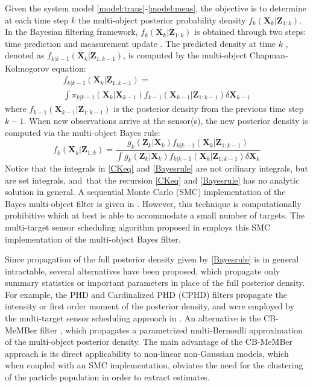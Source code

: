 \documentclass[twocolumn]{autart}
\begin{document}
Given the system model \eqref{model:trans}-\eqref{model:meas}, the objective
is to determine at each time step $k$ the multi-object posterior probability
density $f_{k}(\mathbf{X}_{k}|\mathbf{Z}_{1:k})$. In the Bayesian filtering
framework, $f_{k}(\mathbf{X}_{k}|\mathbf{Z}_{1:k})$ is obtained through two
steps: time prediction and measurement update \cite{Mah07}. The predicted
density at time $k$ , denoted as $f_{k|k-1}(\mathbf{X}_{k}|\mathbf{Z}_{1:k-1})$, is computed by the multi-object Chapman-Kolmogorov equation:
\begin{multline}\label{CKeq}
f_{k|k-1}(\mathbf{X}_k|\mathbf{Z}_{1:k-1}) =\\
 \int \pi_{k|k-1}(\mathbf{X}_k|\mathbf{X}_{k-1})f_{k-1}(\mathbf{X}_{k-1}|\mathbf{Z}_{1:k-1})\delta \mathbf{X}_{k-1}
\end{multline}
where $f_{k-1}(\mathbf{X}_{k-1}|\mathbf{Z}_{1:k-1})$ is the posterior
density from the previous time step $k-1$. When new observations arrive at
the sensor(s), the new posterior density is computed via the multi-object
Bayes rule:
\begin{equation}
f_{k}(\mathbf{X}_{k}|\mathbf{Z}_{1:k})=\frac{g_{k}(\mathbf{Z}_{k}|\mathbf{X}_{k})f_{k|k-1}(\mathbf{X}_{k}|\mathbf{Z}_{1:k-1})}{\int g_{k}(\mathbf{Z}_{k}|\mathbf{X}_{k})f_{k|k-1}(\mathbf{X}_{k}|\mathbf{Z}_{1:k-1})\delta \mathbf{X}_{k}}  \label{Bayesrule}
\end{equation}Notice that the integrals in \eqref{CKeq} and \eqref{Bayesrule} are not
ordinary integrals, but are set integrals, and\ that the recursion \eqref{CKeq} and \eqref{Bayesrule} has no analytic solution in general. A
sequential Monte Carlo (SMC) implementation of the Bayes multi-object filter
is given in \cite{VoAES}. However, this technique is computationally
prohibitive which at best is able to accommodate a small number of targets.
The multi-target sensor scheduling algorithm proposed in \cite{RV10} employs
this SMC implementation of the multi-object Bayes filter.

Since propagation of the full posterior density given by \eqref{Bayesrule}
is in general intractable, several alternatives have been proposed, which
propagate only summary statistics or important parameters in place of the
full posterior density. For example, the PHD and Cardinalized PHD (CPHD)
filters \cite{Mah03,MahlerCPHD,VoMaGMPHD05,VoAES,VoGaussianCPHD07} propagate
the intensity or first order moment of the posterior density, and were employed by the
multi-target sensor scheduling approach in \cite{RVC11}. An alternative is the
CB-MeMBer filter \cite{Mah07,VVC09}, which propagates a parametrized
multi-Bernoulli approximation of the multi-object posterior density.  The main advantage of the CB-MeMBer approach is its direct
applicability to non-linear non-Gaussian models, which when coupled with an
SMC implementation, obviates the need for the clustering of the particle
population in order to extract estimates.
\end{document}
